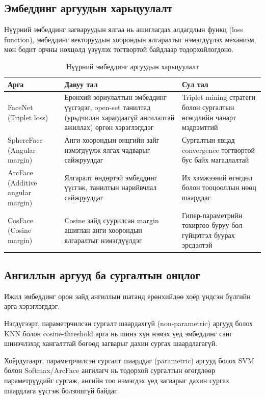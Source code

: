 \subsection{Эмбеддинг аргуудын харьцуулалт}

Нүүрний эмбеддинг загваруудын ялгаа нь ашиглагдах алдагдлын функц (loss function), эмбеддинг векторуудын хоорондын ялгаралтыг нэмэгдүүлэх механизм, мөн бодит орчны нөхцөлд үзүүлэх тогтвортой байдлаар тодорхойлогдоно.

\begin{table}[H]
\centering
\caption{Нүүрний эмбеддинг аргуудын харьцуулалт}
\begin{tabularx}{\textwidth}{|l|X|X|}
\hline
\textbf{Арга} & \textbf{Давуу тал} & \textbf{Сул тал} \\
\hline
FaceNet (Triplet loss) & Ерөнхий зориулалтын эмбеддинг үүсгэдэг, open-set танилтад (урьдчилан харагдаагүй ангилалтай ажиллах) өргөн хэрэглэгддэг & Triplet mining стратеги болон сургалтын өгөгдлийн чанарт мэдрэмтгий \\
\hline
SphereFace (Angular margin) & Анги хоорондын өнцгийн зайг нэмэгдүүлж ялгах чадварыг сайжруулдаг & Сургалтын явцад convergence тогтвортой бус байх магадлалтай \\
\hline
ArcFace (Additive angular margin) & Ялгаралт өндөртэй эмбеддинг үүсгэж, танилтын нарийвчлал сайжруулдаг & Их хэмжээний өгөгдөл болон тооцооллын нөөц шаарддаг \\
\hline
CosFace (Cosine margin) & Cosine зайд суурилсан margin ашиглан анги хоорондын ялгаралтыг нэмэгдүүлдэг & Гипер-параметрийн тохиргоо буруу бол гүйцэтгэл буурах эрсдэлтэй \\
\hline
\end{tabularx}
\end{table}

\subsection{Ангиллын аргууд ба сургалтын онцлог}
Ижил эмбеддинг орон зайд ангиллын шатанд ерөнхийдөө хоёр үндсэн бүлгийн арга хэрэглэгддэг. 

Нэгдүгээрт, параметрчилсэн сургалт шаардахгүй (non-parametric) аргууд болох KNN болон cosine-threshold арга нь шинэ хүн нэмэх үед эмбеддинг санг шинэчлэхэд хангалттай бөгөөд загварыг дахин сургах шаардлагагүй.

Хоёрдугаарт, параметрчилсэн сургалт шаарддаг (parametric) аргууд болох SVM болон Softmax/ArcFace ангилагч нь тодорхой сургалтын өгөгдлөөр параметрүүдийг сургаж, ангийн тоо нэмэгдэх үед загварыг дахин сургах шаардлага үүсгэж болзошгүй байдаг.

